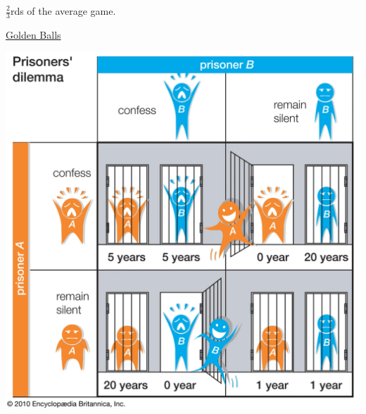 \documentclass{beamer}
\begin{document}
\begin{frame}
    \begin{center}
        \(\frac{2}{3}\)rds of the average game.
    \end{center}
\end{frame}

\begin{frame}
    \begin{center}
        \huge
        \href{https://youtu.be/7FbkwrhW_0I?t=237}{Golden Balls}
    \end{center}
\end{frame}


\begin{frame}
    \centering
    
    \includegraphics[height=.9\textheight]{Bin/prisonersdilemma.PNG}

\end{frame}
\end{document}
